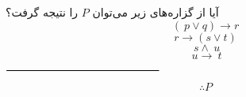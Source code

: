 \EXERCISE
آیا از گزاره‌های زیر می‌توان
$P$
را نتیجه گرفت؟
$$(~p \vee q) \rightarrow r$$
$$r \rightarrow (s \vee t)$$
$$~s \wedge ~u$$
$$~u \rightarrow ~t$$
\begin{center}
	$\rule{0.4\textwidth}{0.8pt}$
\end{center}
$$ \therefore P$$